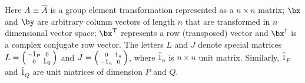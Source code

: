 \begin{unit}
\begin{center}
\begin{tabular}{>{$}l<{$} >{$}l<{$} >{$}l<{$} >{$}l<{$} >{}l<{} >{$}l<{$}}
\end{tabular}
\end{center}
Here $A\equiv\hat{A}$ is a group element transformation
represented as a $n\times n$ matrix;  $\bx$ and $\by$ are
arbitrary column vectors of length $n$ that are transformed in $n$
dimensional vector space; $\bx^{\textrm{T}}$ represents a row
(transposed) vector and $\bx^{\dagger}$ is a complex conjugate row
vector. The letters $L$ and $J$ denote special matrices
$L=\Bigl(\begin{smallmatrix}-\hat{1}_P&0\\0&\hat{1}_Q\end{smallmatrix}\Bigr)$
and
$J=\Bigl(\begin{smallmatrix}0&\hat{1}_n\\-\hat{1}_n&0\end{smallmatrix}\Bigr)$,
where $\hat{1}_n$ is $n\times n$ unit matrix. Similarly,
$\hat{1}_P$ and $\hat{1}_Q$ are unit matrices of dimension $P$ and $Q$.
\end{unit}
